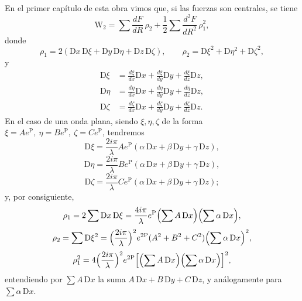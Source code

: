 En el primer capítulo de esta obra vimos que, si las fuerzas son
centrales, se tiene
\[
\mathrm{W}_2=\sum \frac{dF}{dR}\,\rho_2+\frac{1}{2}\sum \frac{d^2F}{dR^2}\,\rho_1^2,
\]
donde
\[
\rho_1=2(\mathrm{D}x\,\mathrm{D}\xi+\mathrm{D}y\,\mathrm{D}\eta+\mathrm{D}z\,\mathrm{D}\zeta),
\qquad
\rho_2=\mathrm{D}\xi^2+\mathrm{D}\eta^2+\mathrm{D}\zeta^2,
\]
y
\begin{align*}
\mathrm{D}\xi&=\frac{d\xi}{dx}\mathrm{D}x+\frac{d\xi}{dy}\mathrm{D}y+\frac{d\xi}{dz}\mathrm{D}z,\\
\mathrm{D}\eta&=\frac{d\eta}{dx}\mathrm{D}x+\frac{d\eta}{dy}\mathrm{D}y+\frac{d\eta}{dz}\mathrm{D}z,\\
\mathrm{D}\zeta&=\frac{d\zeta}{dx}\mathrm{D}x+\frac{d\zeta}{dy}\mathrm{D}y+\frac{d\zeta}{dz}\mathrm{D}z.
\end{align*}
En el caso de una onda plana, siendo $\xi,\eta,\zeta$ de la forma
$\xi=Ae^{\mathrm P},\ \eta=Be^{\mathrm P},\ \zeta=Ce^{\mathrm P}$, tendremos
\[
\mathrm{D}\xi=\frac{2i\pi}{\lambda}Ae^{\mathrm P}(\alpha\,\mathrm{D}x+\beta\,\mathrm{D}y+\gamma\,\mathrm{D}z),
\]
\[
\mathrm{D}\eta=\frac{2i\pi}{\lambda}Be^{\mathrm P}(\alpha\,\mathrm{D}x+\beta\,\mathrm{D}y+\gamma\,\mathrm{D}z),
\]
\[
\mathrm{D}\zeta=\frac{2i\pi}{\lambda}Ce^{\mathrm P}(\alpha\,\mathrm{D}x+\beta\,\mathrm{D}y+\gamma\,\mathrm{D}z);
\]
y, por consiguiente,
\[
\rho_1=2\sum \mathrm{D}x\,\mathrm{D}\xi=\frac{4i\pi}{\lambda}e^{\mathrm P}\Bigl(\sum A\,\mathrm{D}x\Bigr)\Bigl(\sum \alpha\,\mathrm{D}x\Bigr),
\]
\[
\rho_2=\sum \mathrm{D}\xi^2=\Bigl(\frac{2i\pi}{\lambda}\Bigr)^2e^{2\mathrm P}(A^2+B^2+C^2)\Bigl(\sum \alpha\,\mathrm{D}x\Bigr)^2,
\]
\[
\rho_1^2=4\Bigl(\frac{2i\pi}{\lambda}\Bigr)^2e^{2\mathrm P}\Bigl[\Bigl(\sum A\,\mathrm{D}x\Bigr)\Bigl(\sum \alpha\,\mathrm{D}x\Bigr)\Bigr]^2,
\]
entendiendo por $\sum A\,\mathrm{D}x$ la suma $A\,\mathrm{D}x+B\,\mathrm{D}y+C\,\mathrm{D}z$, y análogamente para $\sum \alpha\,\mathrm{D}x$.

